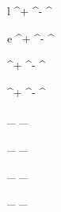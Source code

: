 

\newmathsymbol{\lepton}      {l}
\newmathsymbol{\lepp}        {\lepton^+}
\newmathsymbol{\lepm}        {\lepton^-}
\newmathsymbol{\leppm}       {\lepton^\pm}
\newmathsymbol{\leplep}      {\lepp\lepm}

\newmathsymbol{\electron}    {e}
\newmathsymbol{\elp}         {\electron^+}
\newmathsymbol{\elm}         {\electron^-}
\newmathsymbol{\elpm}        {\electron^\pm}
\newmathsymbol{\elel}        {\elp\elm}

\newmathsymbol{\muon}        {\mu}
\newmathsymbol{\mup}         {\muon^+}
\newmathsymbol{\mum}         {\muon^-}
\newmathsymbol{\mupm}        {\muon^\pm}
\newmathsymbol{\mumu}        {\mup\mum}

\newmathsymbol{\tauon}       {\tau}
\newmathsymbol{\taup}        {\tauon^+}
\newmathsymbol{\taum}        {\tauon^-}
\newmathsymbol{\taupm}       {\tauon^\pm}
\newmathsymbol{\tautau}      {\taup\taum}

\newmathsymbol{\neutrino}    {\nu}
\newmathsymbol{\neutrinobar} {\ovE \neutrino}

\newmathsymbol{\nuel}        {\neutrino_\electron}
\newmathsymbol{\nuelbar}     {\neutrinobar_\electron}

\newmathsymbol{\numu}        {\neutrino_\muon}
\newmathsymbol{\numubar}     {\neutrinobar_\muon}

\newmathsymbol{\nutau}       {\neutrino_\tauon}
\newmathsymbol{\nutaubar}    {\neutrinobar_\tauon}

\newmathsymbol{\nulep}       {\neutrino_\lepton}
\newmathsymbol{\nulepbar}    {\neutrinobar_\lepton}
